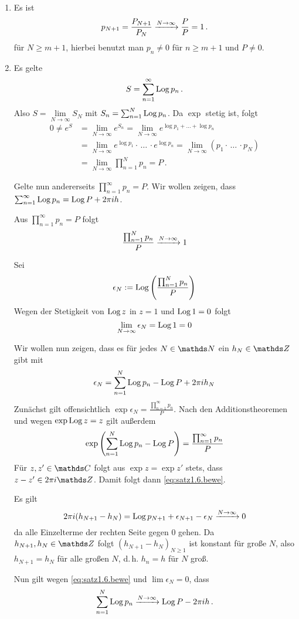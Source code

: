 \begin{bewe}
\begin{enumerate}
\item Es ist
\[
	p_{N+1}
	= \frac{P_{N+1}}{P_N}
	\xrightarrow{N\to\infty} \frac{P}{P}
	= 1
	\,.
\]
für $N\geq m+1$, hierbei benutzt man $p_n \not= 0$ für $n\geq m+1$ und $P \not= 0$.

\item Es gelte
\[
	S
	= \sum _{n=1}^\infty \operatorname{Log} p_n
	\,.
\]
Also $S = \lim \limits _{N\to\infty} S_N$ mit $S_n = \sum_{n=1}^N \operatorname{Log} p_n$.
Da $\exp$ stetig ist, folgt
\begin{align*}
	0
	\not= e^S
	&= \lim _ {N\to \infty} e^{S_n} = \lim_{N\to\infty} e^{\log p_1 + \ldots + \log p_n} \\
	&= \lim _ {N\to \infty} e^{\log p_1} \cdot\,\ldots\,\cdot e^{\log p_n}
	= \lim _ {N\to \infty} (p_1 \cdot\,\ldots\,\cdot p_N) \\
	&= \lim _ {N\to \infty} \prod _{n=1}^N p_n
	= P
	\,.
\end{align*}

Gelte nun andererseits $\prod_{n=1}^\infty p_n = P$.
Wir wollen zeigen, dass $\sum _{n=1}^\infty \operatorname{Log} p_n = \operatorname{Log} P + 2\pi ih$.

Aus $\prod_{n=1}^\infty p_n = P$ folgt
\[
	\frac{\prod_{n=1}^N p_n}{P} \xrightarrow{N\to\infty} 1
\]

Sei
\[
	\epsilon_N := \operatorname{Log} \left(\frac{\prod_{n=1}^N p_n}{P}\right)
\]
Wegen der Stetigkeit von $\operatorname{Log} z$ in $z=1$ und $\operatorname{Log} 1 = 0$ folgt
\[
	\lim_{N\to\infty}\epsilon_N = \operatorname{Log} 1 = 0
\]

Wir wollen nun zeigen, dass es für jedes $N\in\NN$ ein $h_N\in\ZZ$ gibt mit
\begin{equation}\label{eq:satz1.6.bewe}
	\epsilon_N = \sum_{n=1}^N \operatorname{Log} p_n - \operatorname{Log} P + 2\pi i h_N
\end{equation}
Zunächst gilt  offensichtlich $\exp \epsilon_N = \frac{\prod_{n=1}^\infty p_n}{P}$.
Nach den Additionstheoremen und wegen $\exp\operatorname{Log} z = z$ gilt außerdem
\[
	\exp \left(\sum_{n=1}^N \operatorname{Log} p_n - \operatorname{Log} P\right)
	= \frac{\prod_{n=1}^\infty p_n}{P}
\]
Für $z, z' \in \CC$ folgt aus $\exp z = \exp z'$ stets, dass $z-z'\in 2\pi i\ZZ$. Damit folgt dann \eqref{eq:satz1.6.bewe}.

Es gilt
\[
	2\pi i(h_{N+1}-h_N) = \operatorname{Log} p_{N+1} + \epsilon_{N+1}-\epsilon_N \xrightarrow{N\to\infty} 0
\]
da alle Einzelterme der rechten Seite gegen 0 gehen.
Da $h_{N+1}, h_N\in\ZZ$ folgt $(h_{N+1} - h_N)_{N\geq 1}$ ist konstant für große $N$, also $h_{N+1} = h_N$ für alle großen $N$, d.\,h. $h_n = h$ für $N$ groß.

Nun gilt wegen \eqref{eq:satz1.6.bewe} und $\lim \epsilon_N = 0$, dass
\[
	\sum_{n=1}^N \operatorname{Log} p_n
	\xrightarrow{N\to\infty}
	\operatorname{Log} P - 2\pi i h
	\,.
\]
\end{enumerate}
\end{bewe}

